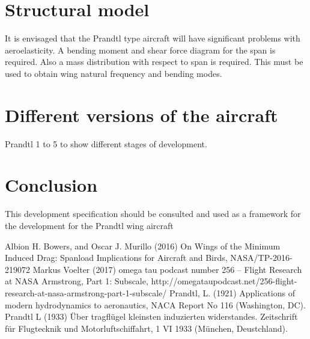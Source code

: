\documentclass{report}
\begin{document}
\section{Structural model}

It is envisaged that the Prandtl type aircraft will have significant problems with aeroelasticity.  A bending moment and shear force diagram for the span is required.  Also a mass distribution with respect to span is required.  This must be used to obtain wing natural frequency and bending modes.


\section{Different versions of the aircraft}

Prandtl 1 to 5 to show different stages of development.

\section{Conclusion}
This development specification should be consulted and used as a framework for the development for the Prandtl wing aircraft


\begin{thebibliography}{99}
 Albion H. Bowers, and Oscar J. Murillo (2016) On Wings of the Minimum Induced Drag:  Spanload Implications for Aircraft and Birds, NASA/TP-2016-219072
 Markus Voelter (2017) omega tau podcast number 256 – Flight Research at NASA Armstrong, Part 1: Subscale, http://omegataupodcast.net/256-flight-research-at-nasa-armstrong-part-1-subscale/
 Prandtl, L.  (1921)  Applications  of  modern hydrodynamics  to  aeronautics,  NACA  Report  No  116 (Washington, DC).
 Prandtl L (1933) Über tragfl\"ugel kleinsten induzierten widerstandes. Zeitschrift für Flugtecknik und Motorluftschiffahrt, 1 VI 1933 (M\"unchen, Deustchland).
\end{thebibliography}
\end{document}
